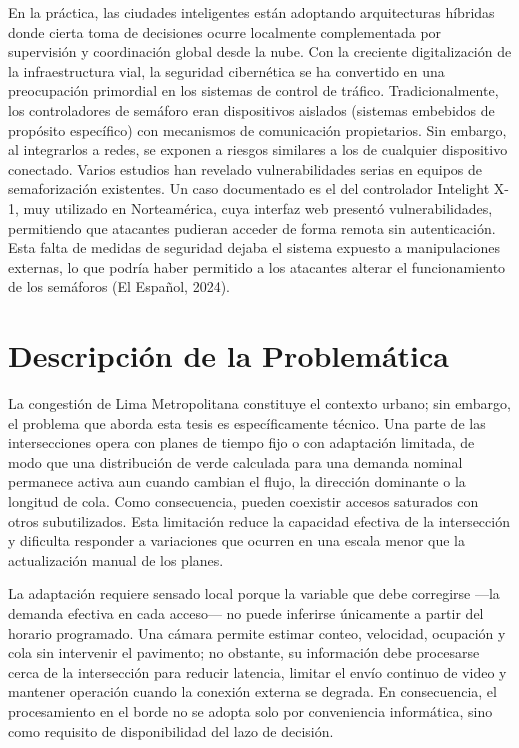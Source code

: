 \documentclass[12pt,a4paper,oneside]{report}
\begin{document}
En la práctica, las ciudades inteligentes están adoptando arquitecturas híbridas donde cierta toma de decisiones ocurre localmente complementada por supervisión y coordinación global desde la nube. Con la creciente digitalización de la infraestructura vial, la seguridad cibernética se ha convertido en una preocupación primordial en los sistemas de control de tráfico. Tradicionalmente, los controladores de semáforo eran dispositivos aislados (sistemas embebidos de propósito específico) con mecanismos de comunicación propietarios. Sin embargo, al integrarlos a redes, se exponen a riesgos similares a los de cualquier dispositivo conectado. Varios estudios han revelado vulnerabilidades serias en equipos de semaforización existentes. Un caso documentado es el del controlador Intelight X-1, muy utilizado en Norteamérica, cuya interfaz web presentó vulnerabilidades, permitiendo que atacantes pudieran acceder de forma remota sin autenticación. Esta falta de medidas de seguridad dejaba el sistema expuesto a manipulaciones externas, lo que podría haber permitido a los atacantes alterar el funcionamiento de los semáforos (El Español, 2024).

\section{Descripción de la Problemática}\label{descripciuxf3n-de-la-problemuxe1tica}

La congestión de Lima Metropolitana constituye el contexto urbano; sin embargo, el problema que aborda esta tesis es específicamente técnico. Una parte de las intersecciones opera con planes de tiempo fijo o con adaptación limitada, de modo que una distribución de verde calculada para una demanda nominal permanece activa aun cuando cambian el flujo, la dirección dominante o la longitud de cola. Como consecuencia, pueden coexistir accesos saturados con otros subutilizados. Esta limitación reduce la capacidad efectiva de la intersección y dificulta responder a variaciones que ocurren en una escala menor que la actualización manual de los planes.

La adaptación requiere sensado local porque la variable que debe corregirse ---la demanda efectiva en cada acceso--- no puede inferirse únicamente a partir del horario programado. Una cámara permite estimar conteo, velocidad, ocupación y cola sin intervenir el pavimento; no obstante, su información debe procesarse cerca de la intersección para reducir latencia, limitar el envío continuo de video y mantener operación cuando la conexión externa se degrada. En consecuencia, el procesamiento en el borde no se adopta solo por conveniencia informática, sino como requisito de disponibilidad del lazo de decisión.
\end{document}
